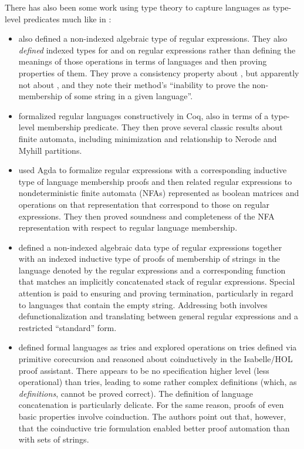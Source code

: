 \documentclass[acmsmall,screen,anonymous,timestamp]{acmart}
\begin{document}
There has also been some work using type theory to capture languages as type-level predicates much like in :
\begin{itemize}

\item \citet{AgularMannaa2009} also defined a non-indexed algebraic type of regular expressions.
They also \emph{defined} indexed types for  and  on regular expressions rather than defining the meanings of those operations in terms of languages and then proving properties of them.
They prove a consistency property about , but apparently not about , and they note their method's ``inability to prove the non-membership of some string in a given language''.

\item \citet{DoczkalEtAl2013} formalized regular languages constructively in Coq, also in terms of a type-level membership predicate.
They then prove several classic results about finite automata, including minimization and relationship to Nerode and Myhill partitions.

\item \citet{FirsovUustalu2013} used Agda to formalize regular expressions with a corresponding inductive type of language membership proofs and then related regular expressions to nondeterministic finite automata (NFAs) represented as boolean matrices and operations on that representation that correspond to those on regular expressions.
They then proved soundness and completeness of the NFA representation with respect to regular language membership.

\item \citet{KorkutEtAl2016} defined a non-indexed algebraic data type of regular expressions together with an indexed inductive type of proofs of membership of strings in the language denoted by the regular expressions and a corresponding function that matches an implicitly concatenated stack of regular expressions.
Special attention is paid to ensuring and proving termination, particularly in regard to languages that contain the empty string.
Addressing both involves defunctionalization and translating between general regular expressions and a restricted ``standard'' form.

\item \citet{Traytel2017} defined formal languages as tries and explored operations on tries defined via primitive corecursion and reasoned about coinductively in the Isabelle/HOL proof assistant.
There appears to be no specification higher level (less operational) than tries, leading to some rather complex definitions (which, as \emph{definitions}, cannot be proved correct).
The definition of language concatenation is particularly delicate.
For the same reason, proofs of even basic properties involve coinduction.
The authors point out that, however, that the coinductive trie formulation enabled better proof automation than with sets of strings.


\end{itemize}
\end{document}
